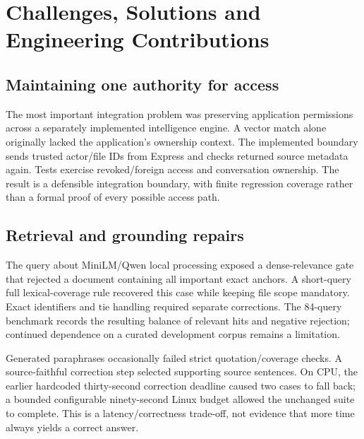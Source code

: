 \chapter{Challenges, Solutions and Engineering Contributions}
\section{Maintaining one authority for access}
The most important integration problem was preserving application permissions across a separately implemented intelligence engine. A vector match alone originally lacked the application's ownership context. The implemented boundary sends trusted actor/file IDs from Express and checks returned source metadata again. Tests exercise revoked/foreign access and conversation ownership. The result is a defensible integration boundary, with finite regression coverage rather than a formal proof of every possible access path.
\section{Retrieval and grounding repairs}
The query about MiniLM/Qwen local processing exposed a dense-relevance gate that rejected a document containing all important exact anchors. A short-query full lexical-coverage rule recovered this case while keeping file scope mandatory. Exact identifiers and tie handling required separate corrections. The 84-query benchmark records the resulting balance of relevant hits and negative rejection; continued dependence on a curated development corpus remains a limitation.

Generated paraphrases occasionally failed strict quotation/coverage checks. A source-faithful correction step selected supporting source sentences. On CPU, the earlier hardcoded thirty-second correction deadline caused two cases to fall back; a bounded configurable ninety-second Linux budget allowed the unchanged suite to complete. This is a latency/correctness trade-off, not evidence that more time always yields a correct answer.
